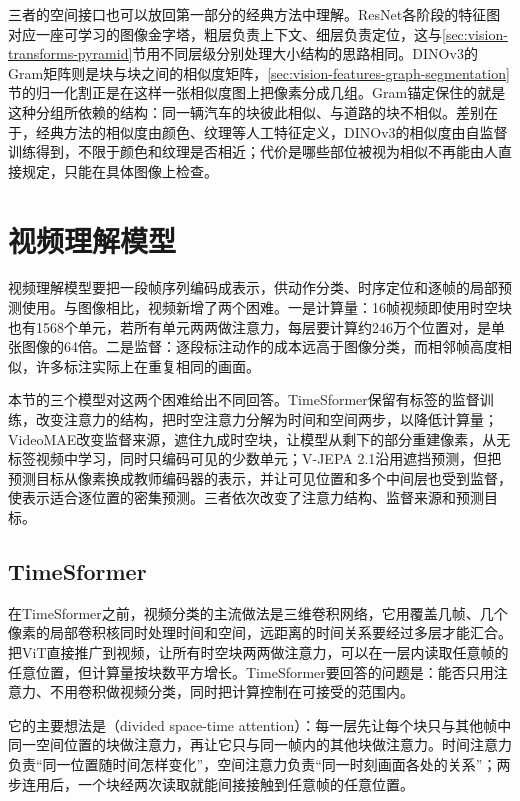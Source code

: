 三者的空间接口也可以放回第一部分的经典方法中理解。ResNet各阶段的特征图对应一座可学习的图像金字塔，粗层负责上下文、细层负责定位，这与\ref{sec:vision-transforms-pyramid}节用不同层级分别处理大小结构的思路相同。DINOv3的Gram矩阵则是块与块之间的相似度矩阵，\ref{sec:vision-features-graph-segmentation}节的归一化割正是在这样一张相似度图上把像素分成几组。Gram锚定保住的就是这种分组所依赖的结构：同一辆汽车的块彼此相似、与道路的块不相似。差别在于，经典方法的相似度由颜色、纹理等人工特征定义，DINOv3的相似度由自监督训练得到，不限于颜色和纹理是否相近；代价是哪些部位被视为相似不再能由人直接规定，只能在具体图像上检查。

\section{视频理解模型}
\label{sec:vision-ivm-video-understanding}

视频理解模型要把一段帧序列编码成表示，供动作分类、时序定位和逐帧的局部预测使用。与图像相比，视频新增了两个困难。一是计算量：16帧视频即使用时空块也有1568个单元，若所有单元两两做注意力，每层要计算约246万个位置对，是单张图像的64倍。二是监督：逐段标注动作的成本远高于图像分类，而相邻帧高度相似，许多标注实际上在重复相同的画面。

本节的三个模型对这两个困难给出不同回答。TimeSformer保留有标签的监督训练，改变注意力的结构，把时空注意力分解为时间和空间两步，以降低计算量；VideoMAE改变监督来源，遮住九成时空块，让模型从剩下的部分重建像素，从无标签视频中学习，同时只编码可见的少数单元；V-JEPA 2.1沿用遮挡预测，但把预测目标从像素换成教师编码器的表示，并让可见位置和多个中间层也受到监督，使表示适合逐位置的密集预测。三者依次改变了注意力结构、监督来源和预测目标。

\subsection{TimeSformer}
\label{sec:vision-ivm-timesformer}

在TimeSformer之前，视频分类的主流做法是三维卷积网络，它用覆盖几帧、几个像素的局部卷积核同时处理时间和空间，远距离的时间关系要经过多层才能汇合。把ViT直接推广到视频，让所有时空块两两做注意力，可以在一层内读取任意帧的任意位置，但计算量按块数平方增长。TimeSformer要回答的问题是：能否只用注意力、不用卷积做视频分类，同时把计算控制在可接受的范围内。

它的主要想法是（divided space-time attention）：每一层先让每个块只与其他帧中同一空间位置的块做注意力，再让它只与同一帧内的其他块做注意力。时间注意力负责“同一位置随时间怎样变化”，空间注意力负责“同一时刻画面各处的关系”；两步连用后，一个块经两次读取就能间接接触到任意帧的任意位置。

